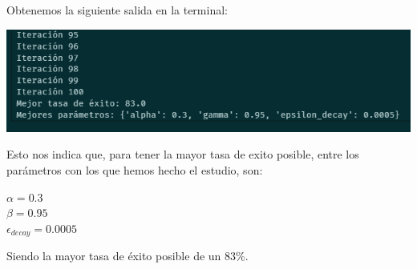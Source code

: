 \documentclass{article}
\begin{document}
\vspace{0.5cm}

Obtenemos la siguiente salida en la terminal:

\vspace{0.5cm}

\begin{center}
    \includegraphics[width=0.75\linewidth]{parametros.png}
\end{center}

\vspace{0.5cm}

Esto nos indica que, para tener la mayor tasa de exito posible, entre los parámetros con los que hemos hecho el estudio, son:

\vspace{0.5cm}

\begin{center}
    $\alpha = 0.3$ \\
    $\beta = 0.95$ \\
    $\epsilon_{decay} = 0.0005$ \\
\end{center}

\vspace{0.5cm}

Siendo la mayor tasa de éxito posible de un 83\%.
\end{document}
